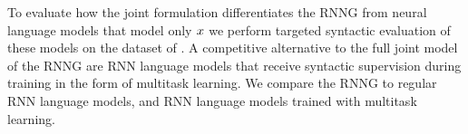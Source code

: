   To evaluate how the joint formulation differentiates the RNNG from neural language models that model only $x$ we perform targeted syntactic evaluation of these models on the dataset of \citep{linzen2018targeted}. A competitive alternative to the full joint model of the RNNG are RNN language models that receive syntactic supervision during training in the form of multitask learning. We compare the RNNG to regular RNN language models, and RNN language models trained with multitask learning.

